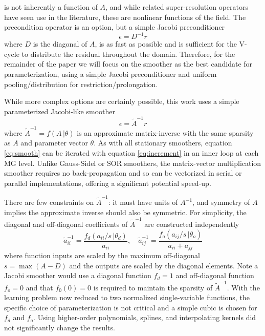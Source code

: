 \documentclass[review]{elsarticle}
\begin{document}
is not inherently a function of $A$, and while related super-resolution operators have seen use in the literature, these are nonlinear functions of the field. The precondition operator is an option, but a simple Jacobi preconditioner
\begin{equation}
    \epsilon = D^{-1}r
\end{equation}
where $D$ is the diagonal of $A$, is as fast as possible and is sufficient for the V-cycle to distribute the residual throughout the domain. Therefore, for the remainder of the paper we will focus on the smoother as the best candidate for parameterization, using a simple Jacobi preconditioner and uniform pooling/distribution for restriction/prolongation.

While more complex options are certainly possible, this work uses a simple parameterized Jacobi-like smoother
\begin{equation}\label{eq:smooth}
    \epsilon = \tilde A^{-1}r
\end{equation}
where $\tilde A^{-1}=f(A\,|\theta)$ is an approximate matrix-inverse with the same sparsity as $A$ and parameter vector $\theta$. 
As with all stationary smoothers, equation \ref{eq:smooth} can be iterated with equation \ref{eq:increment} in an inner loop at each MG level. Unlike Gauss-Sidel or SOR smoothers, the matrix-vector multiplication smoother requires no back-propagation and so can be vectorized in serial or parallel implementations, offering a significant potential speed-up. 

There are few constraints on $\tilde A^{-1}$: it must have units of $A^{-1}$, and symmetry of $A$ implies the approximate inverse should also be symmetric. For simplicity, the diagonal and off-diagonal coefficients of $\tilde A^{-1}$ are constructed independently 
\begin{equation}\label{eq:approxinv}
    \tilde a^{-1}_{ii} = \frac{f_d(a_{ii}/s\,|\theta_d)}{a_{ii}} , \quad
    \tilde a^{-1}_{ij} = \frac{f_o(a_{ij}/s\,|\theta_o)}{a_{ii}+a_{jj}}
\end{equation}
where function inputs are scaled by the maximum off-diagonal $s=\max(A-D)$ and the outputs are scaled by the diagonal elements. Note a Jacobi smoother would use a diagonal function $f_d=1$ and off-diagonal function $f_o=0$ and that $f_0(0)=0$ is required to maintain the sparsity of $\tilde A^{-1}$. With the learning problem now reduced to two normalized single-variable functions, the specific choice of parameterization is not critical and a simple cubic is chosen for $f_d$ and $f_o$. Using higher-order polynomials, splines, and interpolating kernels did not significantly change the results.
\end{document}

